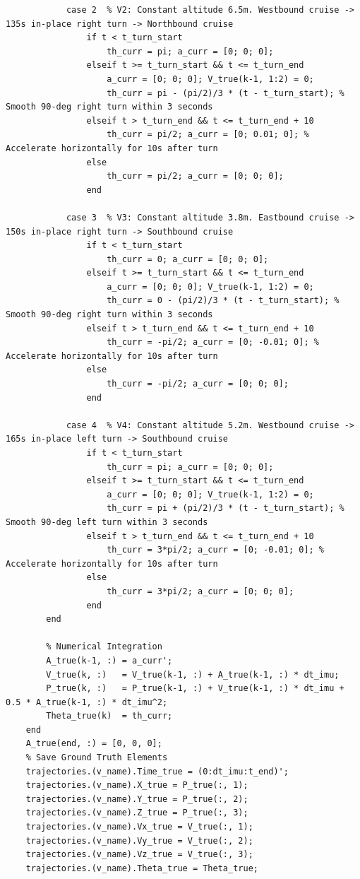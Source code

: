 \documentclass[twocolumn,10pt]{article}
\begin{document}
\begin{lstlisting}
            case 2  % V2: Constant altitude 6.5m. Westbound cruise -> 135s in-place right turn -> Northbound cruise
                if t < t_turn_start
                    th_curr = pi; a_curr = [0; 0; 0];
                elseif t >= t_turn_start && t <= t_turn_end
                    a_curr = [0; 0; 0]; V_true(k-1, 1:2) = 0;
                    th_curr = pi - (pi/2)/3 * (t - t_turn_start); % Smooth 90-deg right turn within 3 seconds
                elseif t > t_turn_end && t <= t_turn_end + 10
                    th_curr = pi/2; a_curr = [0; 0.01; 0]; % Accelerate horizontally for 10s after turn
                else
                    th_curr = pi/2; a_curr = [0; 0; 0];
                end
                
            case 3  % V3: Constant altitude 3.8m. Eastbound cruise -> 150s in-place right turn -> Southbound cruise
                if t < t_turn_start
                    th_curr = 0; a_curr = [0; 0; 0];
                elseif t >= t_turn_start && t <= t_turn_end
                    a_curr = [0; 0; 0]; V_true(k-1, 1:2) = 0;
                    th_curr = 0 - (pi/2)/3 * (t - t_turn_start); % Smooth 90-deg right turn within 3 seconds
                elseif t > t_turn_end && t <= t_turn_end + 10
                    th_curr = -pi/2; a_curr = [0; -0.01; 0]; % Accelerate horizontally for 10s after turn
                else
                    th_curr = -pi/2; a_curr = [0; 0; 0];
                end
                
            case 4  % V4: Constant altitude 5.2m. Westbound cruise -> 165s in-place left turn -> Southbound cruise
                if t < t_turn_start
                    th_curr = pi; a_curr = [0; 0; 0];
                elseif t >= t_turn_start && t <= t_turn_end
                    a_curr = [0; 0; 0]; V_true(k-1, 1:2) = 0;
                    th_curr = pi + (pi/2)/3 * (t - t_turn_start); % Smooth 90-deg left turn within 3 seconds
                elseif t > t_turn_end && t <= t_turn_end + 10
                    th_curr = 3*pi/2; a_curr = [0; -0.01; 0]; % Accelerate horizontally for 10s after turn
                else
                    th_curr = 3*pi/2; a_curr = [0; 0; 0];
                end
        end
        
        % Numerical Integration
        A_true(k-1, :) = a_curr';
        V_true(k, :)   = V_true(k-1, :) + A_true(k-1, :) * dt_imu;
        P_true(k, :)   = P_true(k-1, :) + V_true(k-1, :) * dt_imu + 0.5 * A_true(k-1, :) * dt_imu^2;
        Theta_true(k)  = th_curr;
    end
    A_true(end, :) = [0, 0, 0];
    % Save Ground Truth Elements
    trajectories.(v_name).Time_true = (0:dt_imu:t_end)';
    trajectories.(v_name).X_true = P_true(:, 1);
    trajectories.(v_name).Y_true = P_true(:, 2);
    trajectories.(v_name).Z_true = P_true(:, 3);
    trajectories.(v_name).Vx_true = V_true(:, 1);
    trajectories.(v_name).Vy_true = V_true(:, 2);
    trajectories.(v_name).Vz_true = V_true(:, 3);
    trajectories.(v_name).Theta_true = Theta_true;
    

\end{lstlisting}
\end{document}
